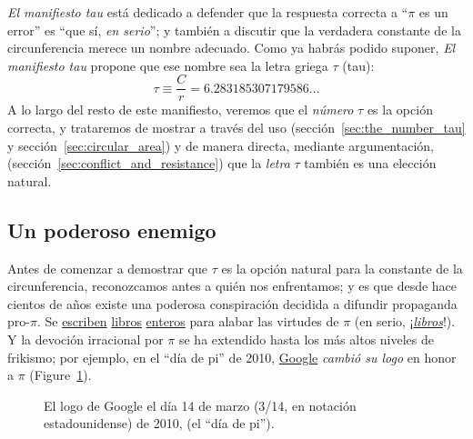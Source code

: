 \emph{El manifiesto tau} está dedicado a defender que la respuesta correcta a ``$\pi$ es un error'' es ``que sí, \emph{en serio}''; y también a discutir que la verdadera constante de la circunferencia merece un nombre adecuado. Como ya habrás podido suponer, \emph{El manifiesto tau} propone que ese nombre sea la letra griega $\tau$ (tau):
\begin{equation}
\label{eq:tau}
\tau \equiv \frac{C}{r} = 6.283185307179586\ldots
\end{equation}
A lo largo del resto de este manifiesto, veremos que el \emph{número} $\tau$ es la opción correcta, y trataremos de mostrar a través del uso (sección~\ref{sec:the_number_tau} y sección~\ref{sec:circular_area}) y de manera directa, mediante argumentación, (sección~\ref{sec:conflict_and_resistance}) que la  \emph{letra} $\tau$ también es una elección natural.

\subsection{Un poderoso enemigo} %
 \label{sec:a_powerful_enemy}

Antes de comenzar a demostrar que $\tau$ es la opción natural para la constante de la circunferencia, reconozcamos antes a quién nos enfrentamos; y es que desde hace cientos de años existe una poderosa conspiración decidida a difundir propaganda pro-$\pi$. Se  \href{http://www.amazon.com/exec/obidos/ISBN=0802713327/parallaxproductiA/}{escriben} \href{http://www.amazon.com/Pi-Sky-Counting-Thinking-Being/dp/0198539568}{libros} \href{http://www.amazon.com/exec/obidos/ISBN=0312381859/parallaxproductiA/}{enteros} para alabar las virtudes de $\pi$ (en serio, ¡\href{http://www.amazon.com/exec/obidos/ISBN=0387989463/parallaxproductiA/}{\emph{libros}}!). Y la devoción irracional por  $\pi$ se ha extendido hasta los más altos niveles de frikismo; por ejemplo, en el ``día de pi'' de 2010, \href{http://www.google.com/}{Google} \emph{cambió su logo} en honor a $\pi$ (Figure~\ref{fig:google_pi_day.}).

\begin{figure}
\begin{center}
\end{center}
\caption{El logo de Google el día 14 de marzo (3/14, en notación estadounidense)
de 2010, (el ``día de pi'').\label{fig:google_pi_day.}}
\end{figure}

